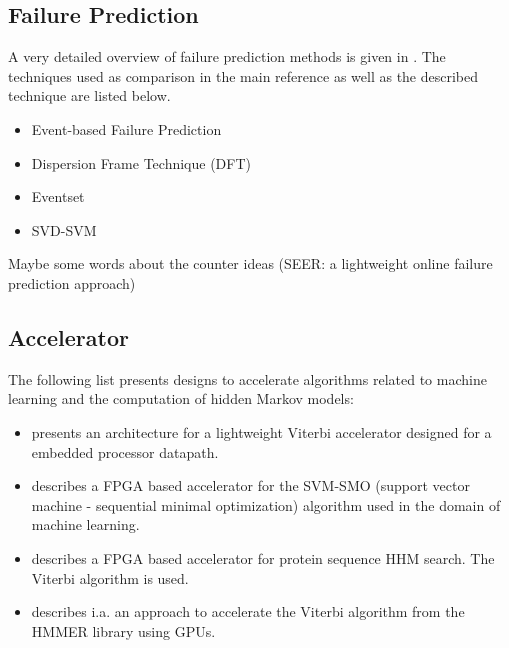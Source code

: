 \documentclass[12pt]{article} %
\begin{document}

\subsection{Failure Prediction} %

A very detailed overview of failure prediction methods is given in
\cite{ACM10_Salfner}. The techniques used as comparison in the main reference
\cite{salfner08} as well as the described technique are listed below.

\begin{itemize} %
    \item Event-based Failure Prediction \cite{salfner08} 
    \item Dispersion Frame Technique (DFT) \cite{lin88,IEEE90_lin}
    \item Eventset \cite{ICDM02_Vilalta}
    \item SVD-SVM \cite{domeniconi02}
\end{itemize}

Maybe some words about the counter ideas (SEER: a lightweight online failure
prediction approach)


\subsection{Accelerator} %

The following list presents designs to accelerate algorithms related to machine
learning and the computation of hidden Markov models:
\begin{itemize}
    \item \cite{ASAP12_Azhar} presents an architecture for a lightweight Viterbi
        accelerator designed for a embedded processor datapath.
    \item \cite{FCCM09_Cadambi} describes a FPGA based accelerator for the
        SVM-SMO (support vector machine - sequential minimal optimization)
        algorithm used in the domain of machine learning.
    \item \cite{IPDPS07_Jacob,ICS06_Maddimsetty,IPDPS07_Oliver} describes a FPGA
        based accelerator for protein sequence HHM search. The Viterbi algorithm
        is used.
    \item \cite{IPDPS09_Walters} describes i.a. an approach to accelerate the
        Viterbi algorithm from the HMMER library using GPUs.
\end{itemize}
\end{document}
